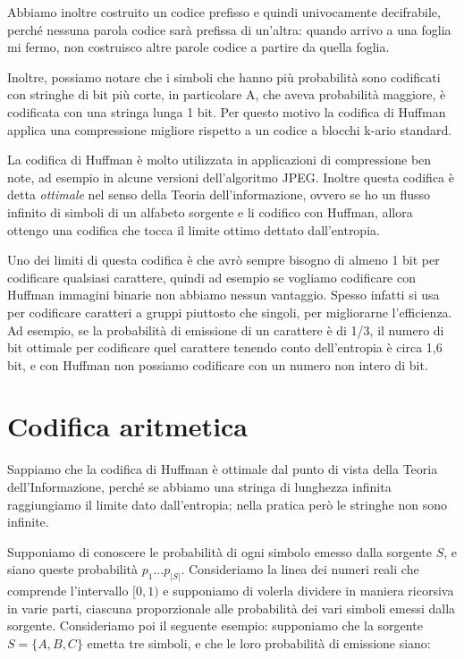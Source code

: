 \FloatBarrier

Abbiamo inoltre costruito un codice prefisso e quindi univocamente decifrabile, perché nessuna parola codice sarà prefissa di un'altra: quando arrivo a una foglia mi fermo, non costruisco altre parole codice a partire da quella foglia. 

Inoltre, possiamo notare che i simboli che hanno più probabilità sono codificati con stringhe di bit più corte, in particolare A, che aveva probabilità maggiore, è codificata con una stringa lunga 1 bit. Per questo motivo la codifica di Huffman applica una compressione migliore rispetto a un codice a blocchi k-ario standard. 

\vspace{5mm}

La codifica di Huffman è molto utilizzata in applicazioni di compressione ben note, ad esempio in alcune versioni dell'algoritmo JPEG. Inoltre questa codifica è detta \textit{ottimale} nel senso della Teoria dell'informazione, ovvero se ho un flusso infinito di simboli di un alfabeto sorgente e li codifico con Huffman, allora ottengo una codifica che tocca il limite ottimo dettato dall'entropia. 

Uno dei limiti di questa codifica è che avrò sempre bisogno di almeno 1 bit per codificare qualsiasi carattere, quindi ad esempio se vogliamo codificare con Huffman immagini binarie non abbiamo nessun vantaggio. Spesso infatti si usa per codificare caratteri a gruppi piuttosto che singoli, per migliorarne l'efficienza. Ad esempio, se la probabilità di emissione di un carattere è di 1/3, il numero di bit ottimale per codificare quel carattere tenendo conto dell'entropia è circa 1,6 bit, e con Huffman non possiamo codificare con un numero non intero di bit. 

\section{Codifica aritmetica}
Sappiamo che la codifica di Huffman è ottimale dal punto di vista della Teoria dell'Informazione, perché se abbiamo una stringa di lunghezza infinita raggiungiamo il limite dato dall'entropia; nella pratica però le stringhe non sono infinite.

Supponiamo di conoscere le probabilità di ogni simbolo emesso dalla sorgente \(S\), e siano queste probabilità \(p_1 \dots p_{|S|}\). Consideriamo la linea dei numeri reali che comprende l'intervallo \([0, 1)\) e supponiamo di volerla dividere in maniera ricorsiva in varie parti, ciascuna proporzionale alle probabilità dei vari simboli emessi dalla sorgente. Consideriamo poi il seguente esempio: supponiamo che la sorgente \(S = \{A,B,C\}\) emetta tre simboli, e che le loro probabilità di emissione siano:

